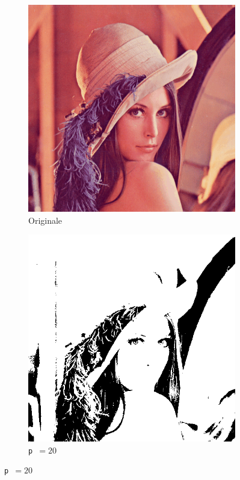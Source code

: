 \documentclass[10pt]{article}
\begin{document}
    \begin{figure}[H]
      \centering
      \begin{subfigure}[b]{0.33\textwidth}
        \centering
        \includegraphics[width=\textwidth]{tex/img/lena.png}
        \caption*{Originale}
      \end{subfigure}
      \hspace{0.2\textwidth}
      \begin{subfigure}[b]{0.33\textwidth}
        \centering
        \includegraphics[width=\textwidth]{img/lena-threshold-20.png}
        \caption*{\texttt{p }\( = 20\)}
      \end{subfigure}


\end{figure}
\end{document}
